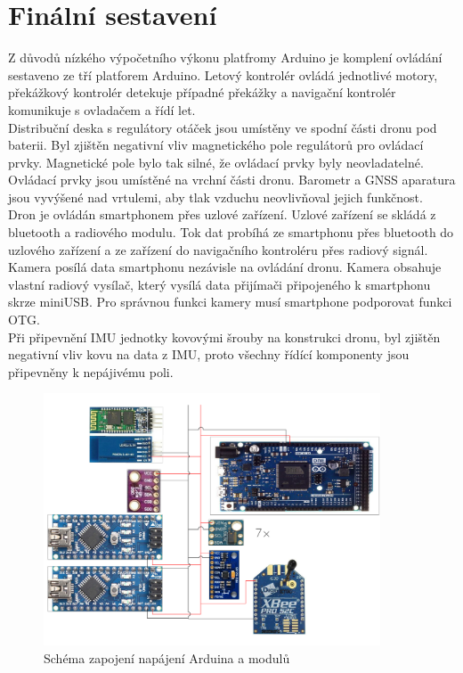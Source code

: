\section{Finální sestavení}
Z důvodů nízkého výpočetního výkonu platfromy Arduino je komplení ovládání sestaveno ze tří platforem Arduino. Letový kontrolér ovládá jednotlivé motory, překážkový kontrolér detekuje případné překážky a navigační kontrolér komunikuje s ovladačem a řídí let.\\
Distribuční deska s regulátory otáček jsou umístěny ve spodní části dronu pod baterii. Byl zjištěn negativní vliv magnetického pole regulátorů pro ovládací prvky. Magnetické pole bylo tak silné, že ovládací prvky byly neovladatelné. Ovládací prvky jsou umístěné na vrchní části dronu. Barometr a GNSS aparatura jsou vyvýšené nad vrtulemi, aby tlak vzduchu neovlivňoval jejich funkčnost.\\
Dron je ovládán smartphonem přes uzlové zařízení. Uzlové zařízení se skládá z bluetooth a radiového modulu. Tok dat probíhá ze smartphonu přes bluetooth do uzlového zařízení a ze zařízení do navigačního kontroléru přes radiový signál.\\
Kamera posílá data smartphonu nezávisle na ovládání dronu. Kamera obsahuje vlastní radiový vysílač, který vysílá data přijímači připojeného k smartphonu skrze miniUSB. Pro správnou funkci kamery musí smartphone podporovat funkci OTG.\\
Při připevnění IMU jednotky kovovými šrouby na konstrukci dronu, byl zjištěn ne\-gativní vliv kovu na data z IMU, proto všechny řídící komponenty jsou připevněny k nepájivému poli.\\
\begin{figure}[h]
	\centering
	\includegraphics[width=10cm]{pictures/pdb_ardu.pdf}
	\caption{Schéma zapojení napájení Arduina a modulů}
\end{figure}
